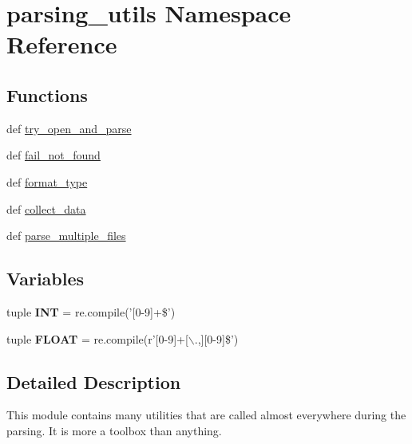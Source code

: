 \hypertarget{namespaceparsing__utils}{\section{parsing\-\_\-utils \-Namespace \-Reference}
\label{namespaceparsing__utils}
}
\subsection*{\-Functions}
\begin{DoxyCompactItemize}
\item 
def \hyperlink{namespaceparsing__utils_a26c14f2e6058ca8d95c4736e40d9a67a}{try\-\_\-open\-\_\-and\-\_\-parse}
\item 
def \hyperlink{namespaceparsing__utils_a194aba83bf612df0d084b30a23f96049}{fail\-\_\-not\-\_\-found}
\item 
def \hyperlink{namespaceparsing__utils_a332025bb554b8559ab10e101fa976f5a}{format\-\_\-type}
\item 
def \hyperlink{namespaceparsing__utils_a5b5e8f373e7060c8e92ac634aac95001}{collect\-\_\-data}
\item 
def \hyperlink{namespaceparsing__utils_a3c916b85614f8335586ba81162362fe6}{parse\-\_\-multiple\-\_\-files}
\end{DoxyCompactItemize}
\subsection*{\-Variables}
\begin{DoxyCompactItemize}
\item 
\hypertarget{namespaceparsing__utils_a9d5465b550734410b49f0c8d211c74c5}{tuple {\bfseries \-I\-N\-T} = re.\-compile('\mbox{[}0-\/9\mbox{]}+\$')}\label{namespaceparsing__utils_a9d5465b550734410b49f0c8d211c74c5}

\item 
\hypertarget{namespaceparsing__utils_a3c22f04fcad5a9e6c2aeb9de8cfbd419}{tuple {\bfseries \-F\-L\-O\-A\-T} = re.\-compile(r'\mbox{[}0-\/9\mbox{]}+\mbox{[}$\backslash$.,\mbox{]}\mbox{[}0-\/9\mbox{]}\$')}\label{namespaceparsing__utils_a3c22f04fcad5a9e6c2aeb9de8cfbd419}

\end{DoxyCompactItemize}


\subsection{\-Detailed \-Description}
\begin{DoxyVerb}
This module contains many utilities that are called almost everywhere
during the parsing.
It is more a toolbox than anything.
\end{DoxyVerb}
 

